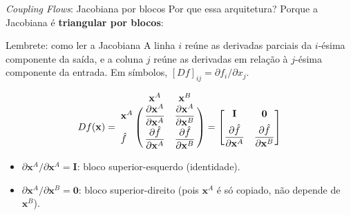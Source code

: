 \documentclass[aspectratio=169,xcolor=dvipsnames]{beamer}
\begin{document}
  \begin{frame}{\textit{Coupling Flows}: Jacobiana por blocos}
    Por que essa arquitetura? Porque a Jacobiana é \textbf{triangular
    por blocos}:
    \vspace{0.2em}
    \begin{block}{Lembrete: como ler a Jacobiana}
      \footnotesize A linha $i$ reúne as derivadas parciais da $i$-ésima
      componente da saída, e a coluna $j$ reúne as derivadas em relação
      à $j$-ésima componente da entrada. Em símbolos,
      $[Df]_{ij} = \partial f_i / \partial x_j$.
    \end{block}
    \vspace{0.2em}
    \[
      Df(\mathbf{x}) =
      \bordermatrix{
        & \mathbf{x}^{A} & \mathbf{x}^{B} \cr
        \mathbf{x}^{A}
          & \dfrac{\partial \mathbf{x}^{A}}{\partial \mathbf{x}^{A}}
          & \dfrac{\partial \mathbf{x}^{A}}{\partial \mathbf{x}^{B}} \cr
        \hat{f}
          & \dfrac{\partial \hat{f}}{\partial \mathbf{x}^{A}}
          & \dfrac{\partial \hat{f}}{\partial \mathbf{x}^{B}} \cr
      }
      =
      \begin{bmatrix}
        \mathbf{I} & \mathbf{0} \\[0.4em]
        \dfrac{\partial \hat{f}}{\partial \mathbf{x}^{A}}
        & \dfrac{\partial \hat{f}}{\partial \mathbf{x}^{B}}
      \end{bmatrix}
    \]
    \vspace{0.1em}
    \begin{itemize}
      \item \textcolor{EncRed}{$\partial \mathbf{x}^{A}/\partial \mathbf{x}^{A} = \mathbf{I}$}:
      bloco superior-esquerdo (identidade).
      \item \textcolor{EncRed}{$\partial \mathbf{x}^{A}/\partial \mathbf{x}^{B} = \mathbf{0}$}:
      bloco superior-direito (pois $\mathbf{x}^{A}$ é só copiado, não depende de $\mathbf{x}^{B}$).
    \end{itemize}
  \end{frame}
\end{document}
